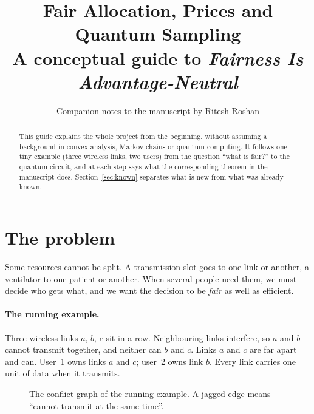 \documentclass[11pt,a4paper]{article}
\title{\textbf{Fair Allocation, Prices and Quantum Sampling}\\[3pt]
\large A conceptual guide to \emph{Fairness Is Advantage-Neutral}}
\author{Companion notes to the manuscript by Ritesh Roshan}
\date{}
\begin{document}
\maketitle

\begin{abstract}
\noindent This guide explains the whole project from the beginning, without assuming a background in
convex analysis, Markov chains or quantum computing. It follows one tiny example (three wireless links,
two users) from the question ``what is fair?'' to the quantum circuit, and at each step says what the
corresponding theorem in the manuscript does. Section~\ref{sec:known} separates what is new from
what was already known.
\end{abstract}

\tableofcontents
\bigskip

\section{The problem}

Some resources cannot be split. A transmission slot goes to one link or another, a ventilator to one
patient or another. When several people need them, we must decide who gets what, and we want the
decision to be \emph{fair} as well as efficient.

\paragraph{The running example.}
Three wireless links $a$, $b$, $c$ sit in a row. Neighbouring links interfere, so $a$ and $b$ cannot
transmit together, and neither can $b$ and $c$. Links $a$ and $c$ are far apart and can. User~1 owns
links $a$ and $c$; user~2 owns link $b$. Every link carries one unit of data when it transmits.

\begin{figure}[h]
\centering
{}
\caption{The conflict graph of the running example. A jagged edge means ``cannot transmit at the same
time''.}
\label{fig:graph}
\end{figure}
\end{document}
